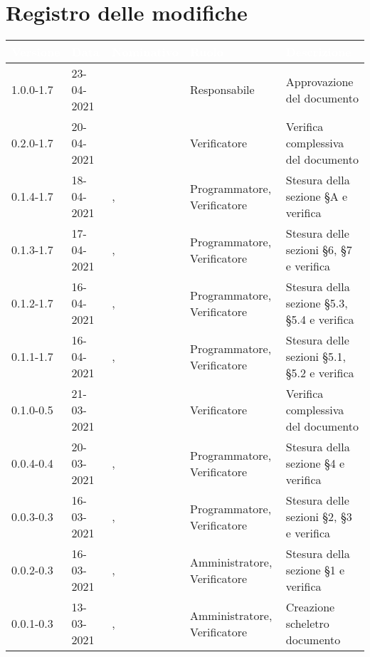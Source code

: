 \section*{Registro delle modifiche}
\setcounter{table}{-1}
{
\renewcommand{\arraystretch}{1.5}
\centering
\begin{longtable}{C{1.7cm} | C{2.2cm} | C{3.2cm} | C{3cm} | C{4.8cm}}
\textcolor{white}{\textbf{Versione}}&
\textcolor{white}{\textbf{Data}}&
\textcolor{white}{\textbf{Nominativo}}&
\textcolor{white}{\textbf{Ruolo}}&
\textcolor{white}{\textbf{Descrizione}}\\	
\endhead

1.0.0-1.7 & 23-04-2021 & \RA{} & Responsabile & Approvazione del documento \\
0.2.0-1.7 & 20-04-2021 & \SP{} &  Verificatore & Verifica complessiva del documento \\
0.1.4-1.7 & 18-04-2021 & \ZM{}, \SG{} & Programmatore, Verificatore & Stesura della sezione \S A e verifica \\
0.1.3-1.7 & 17-04-2021 & \PA{}, \BM{} & Programmatore, Verificatore & Stesura delle sezioni \S 6, \S 7  e verifica\\
0.1.2-1.7 & 16-04-2021 & \SH{}, \SG{} & Programmatore, Verificatore & Stesura della sezione \S 5.3, \S 5.4  e verifica\\
0.1.1-1.7 & 16-04-2021 & \ZM{}, \SP{} & Programmatore, Verificatore & Stesura delle sezioni \S 5.1, \S 5.2 e verifica \\
0.1.0-0.5 & 21-03-2021 & \SG{} & Verificatore & Verifica complessiva del documento\\
0.0.4-0.4 & 20-03-2021 & \PA{}, \BM{} & Programmatore, Verificatore & Stesura della sezione \S 4  e verifica\\
0.0.3-0.3 & 16-03-2021 & \RA{}, \SG{} & Programmatore, Verificatore & Stesura delle sezioni \S 2, \S 3 e verifica \\
0.0.2-0.3 & 16-03-2021 & \SH{}, \BM{} & Amministratore, Verificatore & Stesura della sezione \S 1  e verifica\\	
0.0.1-0.3 & 13-03-2021 & \RA{}, \SP{} & Amministratore, Verificatore & Creazione scheletro documento \\
		
\end{longtable}
}